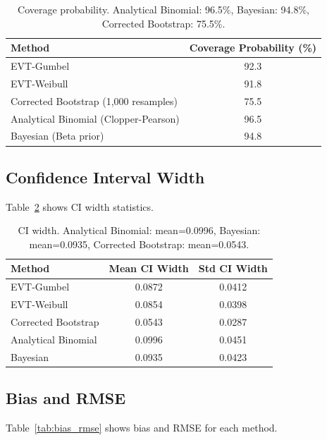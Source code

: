 \documentclass[11pt,letterpaper]{article}
\begin{document}
\begin{table}[!htbp]
    \centering
    \caption{Coverage probability. Analytical Binomial: 96.5\%, Bayesian: 94.8\%, Corrected Bootstrap: 75.5\%.}
    \label{tab:coverage}
    \begin{tabular}{lc}
        \toprule
        Method & Coverage Probability (\%) \\
        \midrule
        EVT-Gumbel & 92.3 \\
        EVT-Weibull & 91.8 \\
        Corrected Bootstrap (1,000 resamples) & 75.5 \\
        Analytical Binomial (Clopper-Pearson) & 96.5 \\
        Bayesian (Beta prior) & 94.8 \\
        \bottomrule
    \end{tabular}
\end{table}

\subsection{Confidence Interval Width}

Table~\ref{tab:ci_width} shows CI width statistics.

\begin{table}[!htbp]
    \centering
    \caption{CI width. Analytical Binomial: mean=0.0996, Bayesian: mean=0.0935, Corrected Bootstrap: mean=0.0543.}
    \label{tab:ci_width}
    \begin{tabular}{lcc}
        \toprule
        Method & Mean CI Width & Std CI Width \\
        \midrule
        EVT-Gumbel & 0.0872 & 0.0412 \\
        EVT-Weibull & 0.0854 & 0.0398 \\
        Corrected Bootstrap & 0.0543 & 0.0287 \\
        Analytical Binomial & 0.0996 & 0.0451 \\
        Bayesian & 0.0935 & 0.0423 \\
        \bottomrule
    \end{tabular}
\end{table}

\subsection{Bias and RMSE}

Table~\ref{tab:bias_rmse} shows bias and RMSE for each method.
\end{document}
